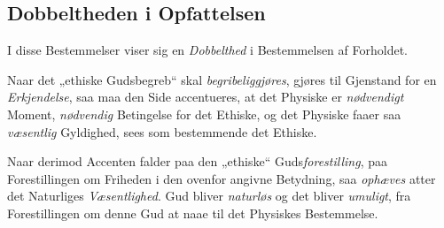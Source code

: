 \documentclass[12pt,a4paper]{book}
\begin{document}
\subsection{Dobbeltheden i Opfattelsen}
\label{ssec:dobbelthed}

I disse Bestemmelser viser sig en \emph{Dobbelthed} i Bestemmelsen af Forholdet.

Naar det „ethiske Gudsbegreb“ skal \emph{begribeliggjøres}, gjøres til Gjenstand for en \emph{Erkjendelse}, saa maa den Side accentueres, at det Physiske er \emph{nødvendigt} Moment, \emph{nødvendig} Betingelse for det Ethiske, og det Physiske faaer saa \emph{væsentlig} Gyldighed,
sees som bestemmende det Ethiske.

Naar derimod Accenten falder paa den „ethiske“ Guds\emph{forestilling}, paa Forestillingen
om Friheden i den ovenfor angivne Betydning, saa \emph{ophæves} atter det Naturliges \emph{Væsentlighed}. Gud bliver \emph{naturløs} og det bliver \emph{umuligt}, fra Forestillingen om denne
Gud at naae til det Physiskes Bestemmelse.
\end{document}
